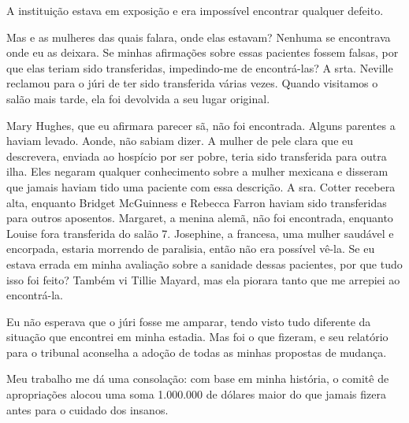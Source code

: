 A instituição estava em exposição e era impossível encontrar qualquer
defeito.

Mas e as mulheres das quais falara, onde elas estavam? Nenhuma se
encontrava onde eu as deixara. Se minhas afirmações sobre essas
pacientes fossem falsas, por que elas teriam sido transferidas,
impedindo-me de encontrá-las? A srta. Neville reclamou para o júri de
ter sido transferida várias vezes. Quando visitamos o salão mais tarde,
ela foi devolvida a seu lugar original.

Mary Hughes, que eu afirmara parecer sã, não foi encontrada. Alguns
parentes a haviam levado. Aonde, não sabiam dizer. A mulher de pele
clara que eu descrevera, enviada ao hospício por ser pobre, teria sido
transferida para outra ilha. Eles negaram qualquer conhecimento sobre a
mulher mexicana e disseram que jamais haviam tido uma paciente com essa
descrição. A sra. Cotter recebera alta, enquanto Bridget McGuinness e
Rebecca Farron haviam sido transferidas para outros aposentos. Margaret,
a menina alemã, não foi encontrada, enquanto Louise fora transferida do
salão 7. Josephine, a francesa, uma mulher saudável e encorpada, estaria
morrendo de paralisia, então não era possível vê-la. Se eu estava errada
em minha avaliação sobre a sanidade dessas pacientes, por que tudo isso
foi feito? Também vi Tillie Mayard, mas ela piorara tanto que me
arrepiei ao encontrá-la.

Eu não esperava que o júri fosse me amparar, tendo visto tudo diferente
da situação que encontrei em minha estadia. Mas foi o que fizeram, e seu
relatório para o tribunal aconselha a adoção de todas as minhas
propostas de mudança.

Meu trabalho me dá uma consolação: com base em minha história, o comitê
de apropriações alocou uma soma 1.000.000 de dólares maior do que jamais
fizera antes para o cuidado dos insanos.